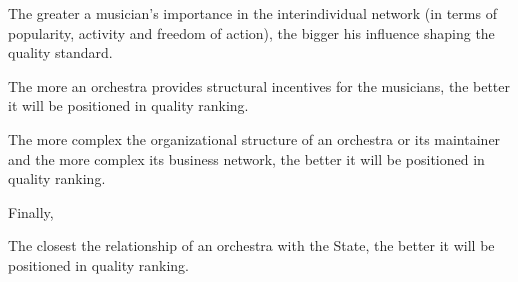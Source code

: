 \documentclass[a4paper, 12pt, openright, oneside, german, french, brazil, english, article]{abntex2}
\begin{document}
	\begin{hip}
		The greater a musician's importance in the interindividual network (in terms of popularity, activity and freedom of action), the bigger his influence shaping the quality standard.
	\end{hip}
	
	
	
	\begin{hip}
		The more an orchestra provides structural incentives for the musicians, the better it will be positioned in quality ranking.
	\end{hip}
	
		
	\begin{hip}
		The more complex the organizational structure of an orchestra or its maintainer and the more complex its business network, the better it will be positioned in quality ranking.
	\end{hip}
	
	Finally,
	
	\begin{hip}
	The closest the relationship of an orchestra with the State, the better it will be positioned in quality ranking.
	\end{hip}
	
	
\end{document}
